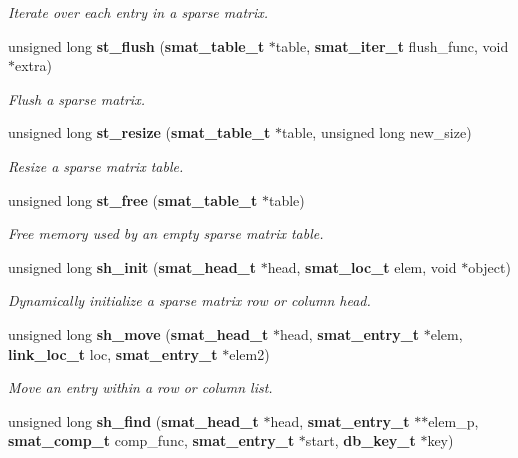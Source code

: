 \begin{CompactItemize}
\begin{CompactList}\small\item\em Iterate over each entry in a sparse matrix.\item\end{CompactList}\item 
unsigned long {\bf st\_\-flush} ({\bf smat\_\-table\_\-t} $\ast$table, {\bf smat\_\-iter\_\-t} flush\_\-func, void $\ast$extra)
\begin{CompactList}\small\item\em Flush a sparse matrix.\item\end{CompactList}\item 
unsigned long {\bf st\_\-resize} ({\bf smat\_\-table\_\-t} $\ast$table, unsigned long new\_\-size)
\begin{CompactList}\small\item\em Resize a sparse matrix table.\item\end{CompactList}\item 
unsigned long {\bf st\_\-free} ({\bf smat\_\-table\_\-t} $\ast$table)
\begin{CompactList}\small\item\em Free memory used by an empty sparse matrix table.\item\end{CompactList}\item 
unsigned long {\bf sh\_\-init} ({\bf smat\_\-head\_\-t} $\ast$head, {\bf smat\_\-loc\_\-t} elem, void $\ast$object)
\begin{CompactList}\small\item\em Dynamically initialize a sparse matrix row or column head.\item\end{CompactList}\item 
unsigned long {\bf sh\_\-move} ({\bf smat\_\-head\_\-t} $\ast$head, {\bf smat\_\-entry\_\-t} $\ast$elem, {\bf link\_\-loc\_\-t} loc, {\bf smat\_\-entry\_\-t} $\ast$elem2)
\begin{CompactList}\small\item\em Move an entry within a row or column list.\item\end{CompactList}\item 
unsigned long {\bf sh\_\-find} ({\bf smat\_\-head\_\-t} $\ast$head, {\bf smat\_\-entry\_\-t} $\ast$$\ast$elem\_\-p, {\bf smat\_\-comp\_\-t} comp\_\-func, {\bf smat\_\-entry\_\-t} $\ast$start, {\bf db\_\-key\_\-t} $\ast$key)
$$
\end{CompactItemize}
